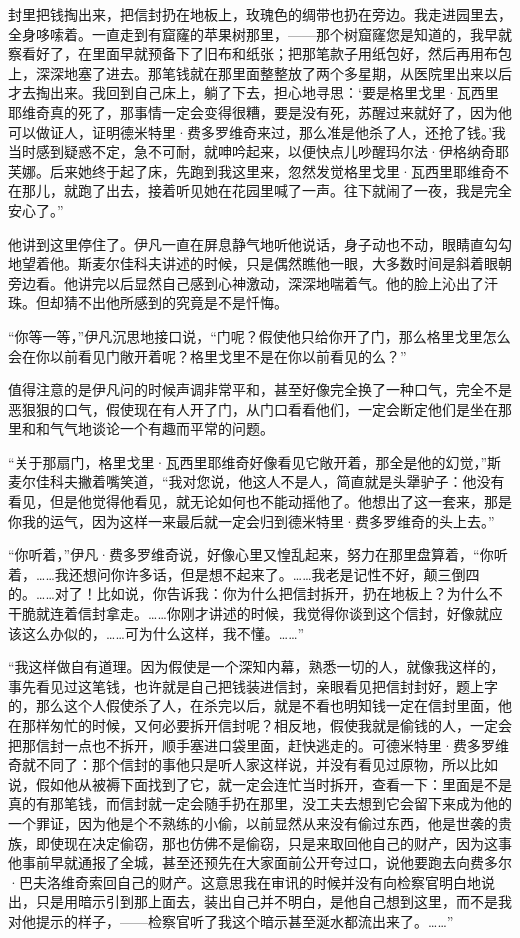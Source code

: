 封里把钱掏出来，把信封扔在地板上，玫瑰色的绸带也扔在旁边。我走进园里去，全身哆嗦着。一直走到有窟窿的苹果树那里，——那个树窟窿您是知道的，我早就察看好了，在里面早就预备下了旧布和纸张；把那笔款子用纸包好，然后再用布包上，深深地塞了进去。那笔钱就在那里面整整放了两个多星期，从医院里出来以后才去掏出来。我回到自己床上，躺了下去，担心地寻思：‘要是格里戈里·瓦西里耶维奇真的死了，那事情一定会变得很糟，要是没有死，苏醒过来就好了，因为他可以做证人，证明德米特里·费多罗维奇来过，那么准是他杀了人，还抢了钱。’我当时感到疑惑不定，急不可耐，就呻吟起来，以便快点儿吵醒玛尔法·伊格纳奇耶芙娜。后来她终于起了床，先跑到我这里来，忽然发觉格里戈里·瓦西里耶维奇不在那儿，就跑了出去，接着听见她在花园里喊了一声。往下就闹了一夜，我是完全安心了。”
\par 他讲到这里停住了。伊凡一直在屏息静气地听他说话，身子动也不动，眼睛直勾勾地望着他。斯麦尔佳科夫讲述的时候，只是偶然瞧他一眼，大多数时间是斜着眼朝旁边看。他讲完以后显然自己感到心神激动，深深地喘着气。他的脸上沁出了汗珠。但却猜不出他所感到的究竟是不是忏悔。
\par “你等一等，”伊凡沉思地接口说，“门呢？假使他只给你开了门，那么格里戈里怎么会在你以前看见门敞开着呢？格里戈里不是在你以前看见的么？”
\par 值得注意的是伊凡问的时候声调非常平和，甚至好像完全换了一种口气，完全不是恶狠狠的口气，假使现在有人开了门，从门口看看他们，一定会断定他们是坐在那里和和气气地谈论一个有趣而平常的问题。
\par “关于那扇门，格里戈里·瓦西里耶维奇好像看见它敞开着，那全是他的幻觉，”斯麦尔佳科夫撇着嘴笑道，“我对您说，他这人不是人，简直就是头犟驴子：他没有看见，但是他觉得他看见，就无论如何也不能动摇他了。他想出了这一套来，那是你我的运气，因为这样一来最后就一定会归到德米特里·费多罗维奇的头上去。”
\par “你听着，”伊凡·费多罗维奇说，好像心里又惶乱起来，努力在那里盘算着，“你听着，……我还想问你许多话，但是想不起来了。……我老是记性不好，颠三倒四的。……对了！比如说，你告诉我：你为什么把信封拆开，扔在地板上？为什么不干脆就连着信封拿走。……你刚才讲述的时候，我觉得你谈到这个信封，好像就应该这么办似的，……可为什么这样，我不懂。……”
\par “我这样做自有道理。因为假使是一个深知内幕，熟悉一切的人，就像我这样的，事先看见过这笔钱，也许就是自己把钱装进信封，亲眼看见把信封封好，题上字的，那么这个人假使杀了人，在杀完以后，就是不看也明知钱一定在信封里面，他在那样匆忙的时候，又何必要拆开信封呢？相反地，假使我就是偷钱的人，一定会把那信封一点也不拆开，顺手塞进口袋里面，赶快逃走的。可德米特里·费多罗维奇就不同了：那个信封的事他只是听人家这样说，并没有看见过原物，所以比如说，假如他从被褥下面找到了它，就一定会连忙当时拆开，查看一下：里面是不是真的有那笔钱，而信封就一定会随手扔在那里，没工夫去想到它会留下来成为他的一个罪证，因为他是个不熟练的小偷，以前显然从来没有偷过东西，他是世袭的贵族，即使现在决定偷窃，那也仿佛不是偷窃，只是来取回他自己的财产，因为这事他事前早就通报了全城，甚至还预先在大家面前公开夸过口，说他要跑去向费多尔·巴夫洛维奇索回自己的财产。这意思我在审讯的时候并没有向检察官明白地说出，只是用暗示引到那上面去，装出自己并不明白，是他自己想到这里，而不是我对他提示的样子，——检察官听了我这个暗示甚至涎水都流出来了。……”
